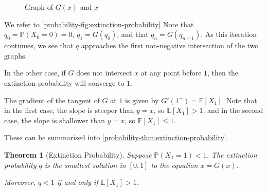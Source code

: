 \documentclass[11pt]{article}
\numberwithin{equation}{section}
\newtheorem{theorem}{Theorem}[section]
\theoremstyle{definition}
\theoremstyle{remark}
\newcommand{\pqty}[1]{\left(#1\right)}
\newcommand{\bqty}[1]{\left[#1\right]}
\newcommand{\Prob}{\mathbb P}
\newcommand{\Expt}{\mathbb E}
\begin{document}
\begin{figure}[ht!]

    \caption{Graph of \(G\pqty{x}\) and \(x\)}
    \label{probability-fig:extinction-probability}
\end{figure}

We refer to \autoref{probability-fig:extinction-probability} Note that \(q_0 = \Prob\pqty{X_0 = 0} = 0\), \(q_1 = G\pqty{q_0}\), and that \(q_n = G\pqty{q_{n - 1}}\). As this iteration continues, we see that \(q\) approaches the first non-negative intersection of the two graphs.

In the other case, if \(G\) does not intersect \(x\) at any point before \(1\), then the extinction probability will converge to \(1\).

The gradient of the tangent of \(G\) at \(1\) is given by \(G'\pqty{1^-} = \Expt\bqty{X_1}\). Note that in the first case, the slope is steeper than \(y = x\), so \(\Expt\bqty{X_1} > 1\); and in the second case, the slope is shallower than \(y = x\), so \(\Expt\bqty{X_1} \leq 1\).

These can be summarised into \autoref{probability-thm:extinction-probability}.

\begin{theorem}[Extinction Probability]\label{probability-theorem-016}
    \label{probability-thm:extinction-probability}%
    Suppose \(\Prob\pqty{X_1 = 1} < 1\). The extinction probability \(q\) is the smallest solution in \([0,1]\) to the equation \(x = G\pqty{x}\).

    Moreover, \(q < 1\) if and only if \(\Expt\bqty{X_1} > 1\).
\end{theorem}
\end{document}
